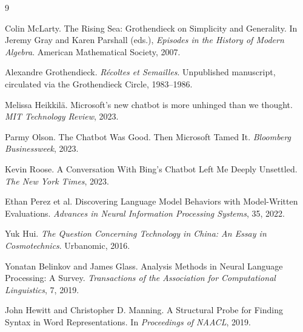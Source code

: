 \documentclass[12pt,a4paper]{article}
\begin{document}

\begin{thebibliography}{9}

Colin McLarty.
\newblock The Rising Sea: Grothendieck on Simplicity and Generality.
\newblock In Jeremy Gray and Karen Parshall (eds.), \emph{Episodes in the History of Modern Algebra}. American Mathematical Society, 2007.

Alexandre Grothendieck.
\newblock \emph{R\'ecoltes et Semailles}.
\newblock Unpublished manuscript, circulated via the Grothendieck Circle, 1983--1986.

Melissa Heikkil\"a.
\newblock Microsoft's new chatbot is more unhinged than we thought.
\newblock \emph{MIT Technology Review}, 2023.

Parmy Olson.
\newblock The Chatbot Was Good. Then Microsoft Tamed It.
\newblock \emph{Bloomberg Businessweek}, 2023.

Kevin Roose.
\newblock A Conversation With Bing's Chatbot Left Me Deeply Unsettled.
\newblock \emph{The New York Times}, 2023.

Ethan Perez et al.
\newblock Discovering Language Model Behaviors with Model-Written Evaluations.
\newblock \emph{Advances in Neural Information Processing Systems}, 35, 2022.

Yuk Hui.
\newblock \emph{The Question Concerning Technology in China: An Essay in Cosmotechnics}.
\newblock Urbanomic, 2016.

Yonatan Belinkov and James Glass.
\newblock Analysis Methods in Neural Language Processing: A Survey.
\newblock \emph{Transactions of the Association for Computational Linguistics}, 7, 2019.

John Hewitt and Christopher D. Manning.
\newblock A Structural Probe for Finding Syntax in Word Representations.
\newblock In \emph{Proceedings of NAACL}, 2019.

\end{thebibliography}
\end{document}
